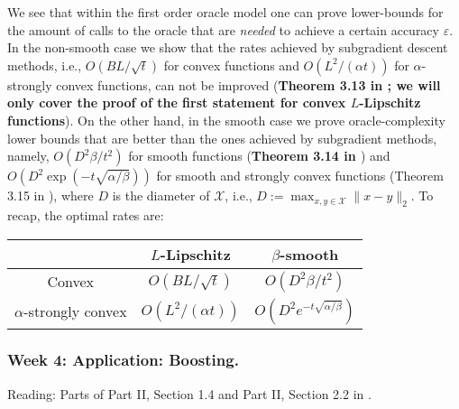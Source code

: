 We see that within the first order oracle model one can prove lower-bounds for the amount of calls to the oracle that are \emph{needed} to achieve a certain accuracy $\varepsilon$.
In the non-smooth case we show that the rates achieved by subgradient descent methods, i.e., $O(BL/\sqrt{t})$ for convex functions and $O(L^2/(\alpha t))$ for $\alpha$-strongly convex functions, can not be improved (\textbf{Theorem 3.13 in \cite{bubeck}; we will only cover the proof of the first statement for convex $L$-Lipschitz functions}).
On the other hand, in the smooth case we prove oracle-complexity lower bounds that are better than the ones achieved by subgradient methods, namely, $O(D^2\beta/t^2)$ for smooth functions (\textbf{Theorem 3.14 in \cite{bubeck}}) and $O(D^2\exp(-t\sqrt{\alpha/\beta}))$ for smooth and strongly convex functions (Theorem 3.15 in \cite{bubeck}), where $D$ is the diameter of $\mathcal{X}$, i.e., $D:=\max_{x,y\in\mathcal{X}}\|x-y\|_2$. To recap, the optimal rates are:
\begin{center}
 \begin{tabular}{|c | c | c|}
 \hline
 & $L$-Lipschitz & $\beta$-smooth\\
 \hline
 Convex & $O(BL/\sqrt{t})$ & $O(D^2\beta/t^2)$\\
 \hline
 $\alpha$-strongly convex & $O(L^2/(\alpha t))$ & $O(D^2e^{-t\sqrt{\alpha/\beta}})$\\
 \hline
\end{tabular}
\end{center}

\subsubsection*{Week 4: Application: Boosting.}
Reading: Parts of Part II, Section 1.4 and Part II, Section 2.2 in \cite{rigollet}.\\

